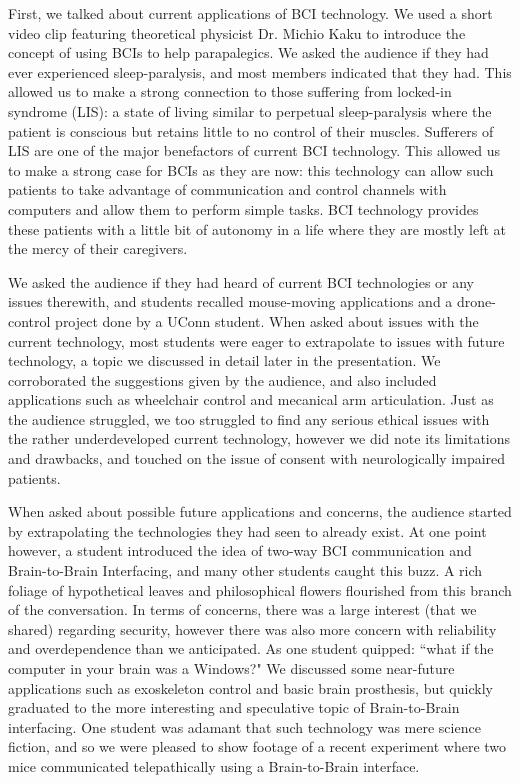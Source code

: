 \documentclass[12pt]{article}
\begin{document}
First, we talked about current applications of BCI technology. We used a short video clip featuring theoretical physicist Dr. Michio Kaku to introduce the concept of using BCIs to help parapalegics. We asked the audience if they had ever experienced sleep-paralysis,  and most members indicated that they had. This allowed us to make a strong connection to those suffering from locked-in syndrome (LIS): a state of living similar to perpetual sleep-paralysis where the patient is conscious but retains little to no control of their muscles. Sufferers of LIS are one of the major benefactors of current BCI technology. This allowed us to make a strong case for BCIs as they are now: this technology can allow such patients to take advantage of communication and control channels with computers and allow them to perform simple tasks. BCI technology provides these patients with a little bit of autonomy in a life where they are mostly left at the mercy of their caregivers.

We asked the audience if they had heard of current BCI technologies or any issues therewith, and students recalled mouse-moving applications and a drone-control project done by a UConn student. When asked about issues with the current technology, most students were eager to extrapolate to issues with future technology, a topic we discussed in detail later in the presentation. We corroborated the suggestions given by the audience, and also included applications such as wheelchair control and mecanical arm articulation. Just as the audience struggled, we too struggled to find any serious ethical issues with the rather underdeveloped current technology, however we did note its limitations and drawbacks, and touched on the issue of consent with neurologically impaired patients.

When asked about possible future applications and concerns, the audience started by extrapolating the technologies they had seen to already exist. At one point however, a student introduced the idea of two-way BCI communication and Brain-to-Brain Interfacing, and many other students caught this buzz. A rich foliage of hypothetical leaves and philosophical flowers flourished from this branch of the conversation. In terms of concerns, there was a large interest (that we shared) regarding security, however there was also more concern with reliability and overdependence than we anticipated. As one student quipped: ``what if the computer in your brain was a Windows?" We discussed some near-future applications such as exoskeleton control and basic brain prosthesis, but quickly graduated to the more interesting and speculative topic of Brain-to-Brain interfacing. One student was adamant that such technology was mere science fiction, and so we were pleased to show footage of a recent experiment where two mice communicated telepathically using a Brain-to-Brain interface.
\end{document}
